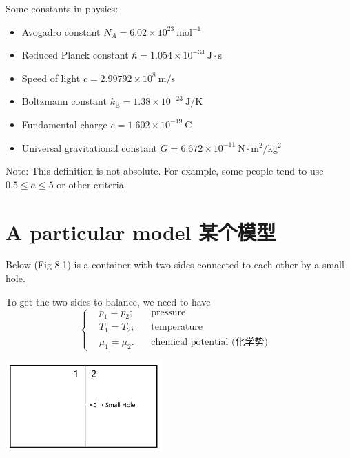 Some constants in physics:

\begin{itemize}
\tightlist{}
\item
  Avogadro constant \(N_A = 6.02 \times 10^{23} \ \mathrm{mol^{-1}}\)
\item
  Reduced Planck constant
  \(\hbar = 1.054 \times 10^{-34} \ \mathrm{J \cdot s}\)
\item
  Speed of light \(c = 2.99792 \times 10^{8} \ \mathrm{m/s}\)
\item
  Boltzmann constant
  \(k_\mathrm{B} = 1.38 \times 10^{-23} \ \mathrm{J/K}\)
\item
  Fundamental charge \(e = 1.602 \times 10^{-19} \ \mathrm{C}\)
\item
  Universal gravitational constant
  \(G = 6.672 \times 10^{-11} \ \mathrm{N \cdot m^2/kg^2}\)
\end{itemize}

Note: This definition is not absolute. For example, some people tend to
use \(0.5 \leq a \leq 5\) or other criteria.

\section{A particular model
某个模型}\label{a-particular-model-ux67d0ux4e2aux6a21ux578b}

Below (Fig 8.1) is a container with two sides connected to each other by a small
hole.

To get the two sides to balance, we need to have \[\left\{
    \begin{aligned}
        & p_1 = p_2; \quad  &\text{pressure} &\\
        & T_1 = T_2; &\text{temperature} &\\
        & \mu_1 = \mu_2. &\text{chemical potential (化学势)} &
    \end{aligned}
\right.\]

\begin{center}
    \includegraphics[height=100pt]{assets/Model_Two_sides.png}
\end{center}

